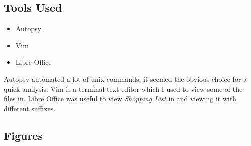 \documentclass[12pt]{article}
\begin{document}
			\subsection{Tools Used}

				\begin{itemize}
					\item Autopsy
					\item Vim
					\item Libre Office
				\end{itemize}

				Autopsy automated a lot of unix commands, it seemed the obvious choice for a quick analysis. Vim is a terminal text editor which I used to view some of the files in. Libre Office was useful to view \textit{Shopping List} in and viewing it with different suffixes.

			\subsection{Figures}
				
\end{document}

